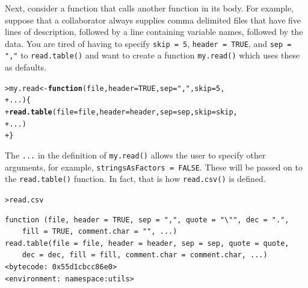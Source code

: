 \documentclass[12pt,oneside]{book}\usepackage[]{graphicx}\usepackage[]{color}
\makeatletter
\newcommand{\hlnum}[1]{\textcolor[rgb]{0.686,0.059,0.569}{#1}}%
\newcommand{\hlstr}[1]{\textcolor[rgb]{0.192,0.494,0.8}{#1}}%
\newcommand{\hlstd}[1]{\textcolor[rgb]{0.345,0.345,0.345}{#1}}%
\newcommand{\hlkwa}[1]{\textcolor[rgb]{0.161,0.373,0.58}{\textbf{#1}}}%
\newcommand{\hlkwb}[1]{\textcolor[rgb]{0.69,0.353,0.396}{#1}}%
\newcommand{\hlkwc}[1]{\textcolor[rgb]{0.333,0.667,0.333}{#1}}%
\newcommand{\hlkwd}[1]{\textcolor[rgb]{0.737,0.353,0.396}{\textbf{#1}}}%
\newenvironment{kframe}{%
 \def\at@end@of@kframe{}%
 \ifinner\ifhmode%
  \def\at@end@of@kframe{\end{minipage}}%
  \begin{minipage}{\columnwidth}%
 \fi\fi%
 \def\FrameCommand##1{\hskip\@totalleftmargin \hskip-\fboxsep
 \colorbox{shadecolor}{##1}\hskip-\fboxsep
     \hskip-\linewidth \hskip-\@totalleftmargin \hskip\columnwidth}%
 \MakeFramed {\advance\hsize-\width
   \@totalleftmargin\z@ \linewidth\hsize
   \@setminipage}}%
 {\par\unskip\endMakeFramed%
 \at@end@of@kframe}
\newenvironment{knitrout}{}{} %
\makeatother
\begin{document}
Next, consider a function that calls another function in its body. For example, suppose that a collaborator always supplies comma delimited files that have five lines of description, followed by a line containing variable names, followed by the data. You are tired of having to specify \verb+skip = 5+, \verb+header = TRUE+, and \verb+sep = ","+ to \verb+read.table()+ and want to create a function \verb+my.read()+ which uses these as defaults. 
\begin{knitrout}
\color{fgcolor}\begin{kframe}
\begin{alltt}
\hlstd{> }\hlstd{my.read} \hlkwb{<-} \hlkwa{function}\hlstd{(}\hlkwc{file}\hlstd{,} \hlkwc{header} \hlstd{=} \hlnum{TRUE}\hlstd{,} \hlkwc{sep} \hlstd{=} \hlstr{","}\hlstd{,} \hlkwc{skip} \hlstd{=} \hlnum{5}\hlstd{,}
\hlstd{+ }    \hlkwc{...}\hlstd{) \{}
\hlstd{+ }    \hlkwd{read.table}\hlstd{(}\hlkwc{file} \hlstd{= file,} \hlkwc{header} \hlstd{= header,} \hlkwc{sep} \hlstd{= sep,} \hlkwc{skip} \hlstd{= skip,}
\hlstd{+ }        \hlstd{...)}
\hlstd{+ }\hlstd{\}}
\end{alltt}
\end{kframe}
\end{knitrout}
The \verb+...+ in the definition of \verb+my.read()+ allows the user to specify other arguments, for example, \verb+stringsAsFactors = FALSE+. These will be passed on to the \verb+read.table()+ function. In fact, that is how \verb+read.csv()+ is defined.
\begin{knitrout}
\color{fgcolor}\begin{kframe}
\begin{alltt}
\hlstd{> }\hlstd{read.csv}
\end{alltt}
\begin{verbatim}
function (file, header = TRUE, sep = ",", quote = "\"", dec = ".", 
    fill = TRUE, comment.char = "", ...) 
read.table(file = file, header = header, sep = sep, quote = quote, 
    dec = dec, fill = fill, comment.char = comment.char, ...)
<bytecode: 0x55d1cbcc86e0>
<environment: namespace:utils>
\end{verbatim}
\end{kframe}
\end{knitrout}
\end{document}
